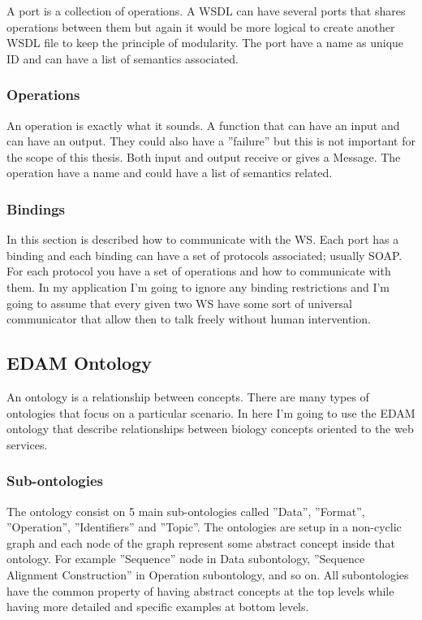 \documentclass[a4paper,10pt]{article}
\begin{document}
    A port is a collection of operations. A WSDL can have several ports that shares operations between them but again it would be more logical to create another WSDL file to keep the principle of modularity. The port have a name as unique ID and can have a list of semantics associated.

    \subsubsection{Operations}

    An operation is exactly what it sounds. A function that can have an input and can have an output. They could also have a ''failure'' but this is not important for the scope of this thesis. Both input and output receive or gives a Message. The operation have a name and could have a list of semantics related.

    \subsubsection{Bindings}
    \label{sec:bindings}
    In this section is described how to communicate with the WS. Each port has a binding and each binding can have a set of protocols associated; usually SOAP. For each protocol you have a set of operations and how to communicate with them. In my application I'm going to ignore any binding restrictions and I'm going to assume that every given two WS have some sort of universal communicator that allow then to talk freely without human intervention.

  \subsection{EDAM Ontology}

  An ontology is a relationship between concepts\cite{ontology}. There are many types of ontologies that focus on a particular scenario. In here I'm going to use the EDAM ontology \cite{journals/bioinformatics/IsonKJBUMMLPR13} that describe relationships between biology concepts oriented to the web services.

    \subsubsection{Sub-ontologies}

    The ontology consist on 5 main sub-ontologies called ''Data'', ''Format'', ''Operation'', ''Identifiers'' and ''Topic''. The ontologies are setup in a non-cyclic graph and each node of the graph represent some abstract concept inside that ontology. For example ''Sequence'' node in Data subontology, ''Sequence Alignment Construction'' in Operation subontology, and so on. All subontologies have the common property of having abstract concepts at the top levels while having more detailed and specific examples at bottom levels.
\end{document}
